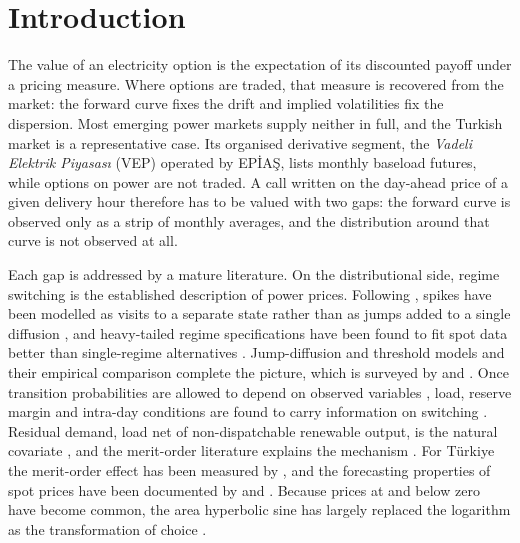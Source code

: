 \section{Introduction}
\label{sec:intro}

The value of an electricity option is the expectation of its discounted payoff
under a pricing measure. Where options are traded, that measure is recovered
from the market: the forward curve fixes the drift and implied volatilities fix
the dispersion. Most emerging power markets supply neither in full, and the
Turkish market is a representative case. Its organised derivative segment, the
\emph{Vadeli Elektrik Piyasası} (VEP) operated by EPİAŞ, lists monthly baseload
futures, while options on power are not traded. A call written on the
day-ahead price of a given delivery hour therefore has to be valued with two
gaps: the forward curve is observed only as a strip of monthly averages, and
the distribution around that curve is not observed at all.

Each gap is addressed by a mature literature. On the distributional side,
regime switching is the established description of power prices. Following
\citet{Hamilton1989}, spikes have been modelled as visits to a separate state
rather than as jumps added to a single diffusion \citep{Deng2000,Huisman2003},
and heavy-tailed regime specifications have been found to fit spot data better
than single-regime alternatives \citep{Weron2009,JanczuraWeron2010}.
Jump-diffusion and threshold models \citep{CarteaFigueroa2005,GemanRoncoroni2006}
and their empirical comparison \citep{BenthKieselNazarova2012} complete the
picture, which is surveyed by \citet{Weron2014} and \citet{Deschatre2021}. Once
transition probabilities are allowed to depend on observed variables
\citep{Diebold1994,Filardo1994}, load, reserve margin and intra-day conditions
are found to carry information on switching
\citep{Mount2006,KanamuraOhashi2008,KarakatsaniBunn2008}. Residual demand, load
net of non-dispatchable renewable output, is the natural covariate
\citep{Wagner2014,Do2021}, and the merit-order literature explains the
mechanism \citep{Sensfuss2008,Ketterer2014,Clo2015}. For Türkiye the
merit-order effect has been measured by \citet{SirinYilmaz2020}, and the
forecasting properties of spot prices have been documented by
\citet{Ugurlu2018} and \citet{Ertugrul2022}. Because prices at and below zero
have become common, the area hyperbolic sine has largely replaced the
logarithm as the transformation of choice \citep{Schneider2011,Uniejewski2018}.

